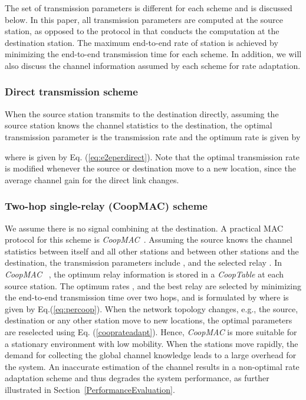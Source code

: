 \documentclass[peerreview,draftcls,onecolumn,12pt,a4paper]{IEEEtran}
\begin{document}
The set of transmission parameters is different for each scheme
and is discussed below. In this paper, all transmission parameters
are computed at the source station, as opposed to the protocol in
\cite{RcoopMAC} that conducts the computation at the destination
station. The maximum end-to-end rate of station  is achieved by
minimizing the end-to-end transmission time for each scheme. In
addition, we will also discuss the channel information assumed by
each scheme for rate adaptation.

\subsubsection{Direct transmission scheme}
When the source station  transmits to the destination directly,
assuming the source station knows the channel statistics to the
destination, the optimal transmission parameter is the
transmission rate  and the optimum rate  is given by

where  is given by Eq. (\ref{eq:e2eperdirect}).
Note that the optimal transmission rate  is modified whenever
the source or destination move to a new location, since the
average channel gain for the direct link changes.

\subsubsection{Two-hop single-relay (CoopMAC) scheme}
We assume there is no signal combining at the destination. A
practical MAC protocol for this scheme is {\em
CoopMAC}~\cite{coopmacliu}. Assuming the source knows the channel
statistics between itself and all other stations and between other
stations and the destination, the transmission parameters include
,  and the selected relay . In {\em CoopMAC}
~\cite{coopmacliu}, the optimum relay information is stored in a
{\em CoopTable} at each source station. The optimum rates ,
 and the best relay  are selected by minimizing the
end-to-end transmission time over two hops, and is formulated by
where  is given by Eq.(\ref{eq:percoop}).  When the
network topology changes, e.g., the source, destination or any
other station move to new locations, the optimal parameters are
reselected using Eq. (\ref{cooprateadapt}). Hence, {\em CoopMAC}
is more suitable for a stationary environment with low mobility.
When the stations move rapidly, the demand for collecting the
global channel knowledge leads to a large overhead for the system. An
inaccurate estimation of the channel results in a non-optimal rate
adaptation scheme and thus degrades the system performance, as further illustrated in Section~\ref{PerformanceEvaluation}.
\end{document}
